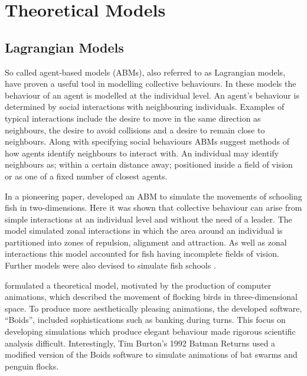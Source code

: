 
\section{Theoretical Models}
\label{sec:models}
\subsection{Lagrangian Models}
\label{ssec:lagrangian_models}

So called agent-based models (ABMs), also referred to as Lagrangian models, have proven a useful tool in modelling collective behaviours. In these models the behaviour of an agent is modelled at the individual level. An agent's behaviour is determined by social interactions with neighbouring individuals. Examples of typical interactions include the desire to move in the same direction as neighbours, the desire to avoid collisions and a desire to remain close to neighbours. Along with specifying social behaviours ABMs suggest methods of how agents identify neighbours to interact with. An individual may identify neighbours as; within a certain distance away; positioned inside a field of vision or as one of a fixed number of closest agents.
	
In a pioneering paper, \citet{aoki82} developed an ABM to simulate the movements of schooling fish in two-dimensions. Here it was shown that collective behaviour can arise from simple interactions at an individual level and without the need of a leader. The model simulated zonal interactions in which the area around an individual is partitioned into zones of repulsion, alignment and attraction. As well as zonal interactions this model accounted for fish having incomplete fields of vision. Further models were also devised to simulate fish schools \citep{okubo86, huth92}.

\citet{reynolds87} formulated a theoretical model, motivated by the production of computer animations, which described the movement of flocking birds in three-dimensional space. To produce more aesthetically pleasing animations, the developed software, ``Boids'', included sophistications such as banking during turns. This focus on developing simulations which produce elegant behaviour made rigorous scientific analysis difficult. Interestingly, Tim Burton's 1992 Batman Returns used a modified version of the Boids software to simulate animations of bat swarms and penguin flocks.

